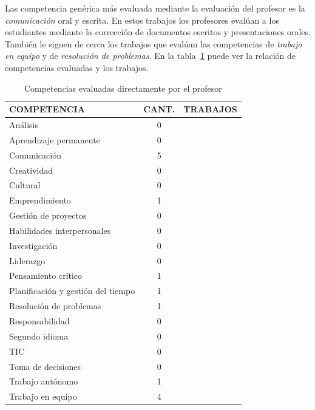 Las competencia genérica más evaluada mediante la evaluación del profesor es la \emph{comunicación} oral y escrita. En estos trabajos los profesores evalúan a los estudiantes mediante la corrección de documentos escritos y presentaciones orales. También le siguen de cerca los trabajos que evalúan las competencias de \emph{trabajo en equipo} y de \emph{resolución de problemas}. En la tabla~\ref{tab:CompetenciasProfesor} puede ver la relación de competencias evaluadas y los trabajos.

\begin{table}
  \begin{center}
  \begin{tabular}{| m{3.5cm} | c | m{9cm} |}
    \hline
    COMPETENCIA & CANT. & TRABAJOS\\
    \hline
    \hline
    Análisis & 0 &  \\
    \hline
    Aprendizaje permanente & 0 &  \\
    \hline
    Comunicación & 5 &  \cite{lacuesta2009active,martin2013acquired,rodriguez2010portfolio,benlloch2007adapting,yang2014fine} \\
    \hline
    Creatividad & 0 &  \\
    \hline
    Cultural & 0 &  \\
    \hline
    Emprendimiento & 1 & \cite{ward2011developing} \\
    \hline
    Gestión de proyectos & 0 & \\
    \hline
    Habilidades interpersonales & 0 &  \\
    \hline
    Investigación & 0 &  \\
    \hline
    Liderazgo & 0 &  \\
    \hline
    Pensamiento crítico & 1 & \cite{lacuesta2009active} \\
    \hline
    Planificación y gestión del tiempo & 1 & \cite{lacuesta2009active} \\
    \hline
    Resolución de problemas & 1 & \cite{martin2013acquired,rodriguez2010portfolio,benlloch2007adapting,vizcarro2013assessment} \\
    \hline
    Responsabilidad & 0 &  \\
    \hline 
    Segundo idioma & 0 &  \\
    \hline
    TIC & 0 & \\
    \hline
    Toma de decisiones & 0 &   \\
    \hline
    Trabajo autónomo & 1 &  \cite{lasa2013problem} \\
    \hline
    Trabajo en equipo & 4 &  \cite{lacuesta2009active,martin2013acquired,rodriguez2010portfolio,benlloch2007adapting} \\
    \hline
  \end{tabular}
\end{center}
\caption{Competencias evaluadas directamente por el profesor}
\label{tab:CompetenciasProfesor}
\end{table}
 



